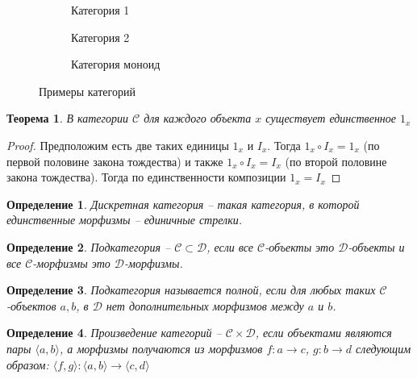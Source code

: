 \documentclass[a4paper, fleqn, draft]{report}
\newtheorem*{defn}{Определение}
\newtheorem*{thm}{Теорема}
\begin{document}
\begin{figure}
\centering
\begin{subfigure}{.33\textwidth}
  \centering
  \caption{Категория 1}
  \label{fig:category-1}
\end{subfigure}%
\begin{subfigure}{.33\textwidth}
  \centering
  \caption{Категория 2}
  \label{fig:category-2}
\end{subfigure}
\begin{subfigure}{.33\textwidth}
  \centering
  \caption{Категория моноид}
  \label{fig:category-2}
\end{subfigure}
\caption{Примеры категорий}
\label{fig:category-example}
\end{figure}

\begin{thm}
  В категории $\mathcal{C}$ для каждого объекта $x$ существует единственное $1_x$
\end{thm}
\begin{proof}
  Предположим есть две таких единицы $1_x$ и $I_x$.
  Тогда $1_x \circ I_x = 1_x$ (по первой половине закона тождества)
  и также $1_x \circ I_x = I_x$ (по второй половине закона тождества).
  Тогда по единственности композиции $1_x = I_x$
\end{proof}

\begin{defn}
  Дискретная категория -- такая категория, в которой единственные морфизмы --
  единичные стрелки.
\end{defn}
\begin{defn}
  Подкатегория -- $\mathcal{C} \subset \mathcal{D}$, если все
  $\mathcal{C}$-объекты это $\mathcal{D}$-объекты и все $\mathcal{C}$-морфизмы
  это $\mathcal{D}$-морфизмы.
\end{defn}
\begin{defn}
  Подкатегория называется полной, если для любых таких $\mathcal{C}$-объектов
  $a, b$, в $\mathcal{D}$ нет дополнительных морфизмов между $a$ и $b$.
\end{defn}
\begin{defn}
  Произведение категорий -- $\mathcal{C} \times \mathcal{D}$, если объектами
  являются пары $\langle a, b \rangle$, а морфизмы получаются из морфизмов
  $f\colon a \to c$, $g\colon b \to d$ следующим образом:
  $\langle f, g \rangle\colon \langle a, b \rangle \to \langle c,d \rangle$
\end{defn}
\end{document}
